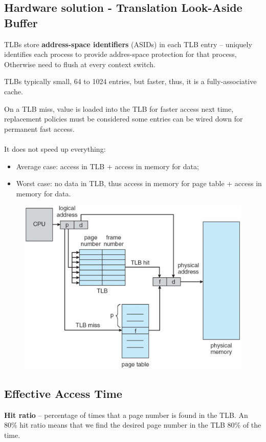 \subsection{Hardware solution - Translation Look-Aside Buffer}

TLBs store \textbf{address-space identifiers} (ASIDs) in each TLB entry – uniquely identifies each process to provide addres-space protection for that process, Otherwise need to flush at every context switch.

TLBs typically small, 64 to 1024 entries, but faster, thus, it is a fully-associative cache.

On a TLB miss, value is loaded into the TLB for faster access next time, replacement policies must be considered some entries can be wired down for permanent fast access.

\paragraph{}
It does not speed up everything:

\begin{itemize}
    \item Average case: access in TLB + access in memory for data;
    \item Worst case: no data in TLB, thus access in memory for page table + access in memory for data.
\end{itemize}

\begin{figure}[htbp]
    \centering
    \includegraphics[width=0.6\linewidth]{img/ythmu.png}
\end{figure}

\subsection{Effective Access Time}

\textbf{Hit ratio} – percentage of times that a page number is found in the TLB. An 80\% hit ratio means that we find the desired page number in the
TLB 80\% of the time.

